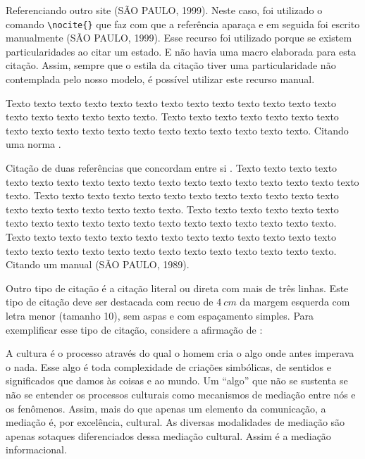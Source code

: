     Referenciando outro site \nocite{secretaria1999}(SÃO PAULO, 1999). Neste caso, foi utilizado o comando \verb=\nocite{}=
    que faz com que a referência aparaça e em seguida foi escrito manualmente (SÃO PAULO, 1999). Esse recurso foi utilizado porque se existem particularidades ao citar um estado. E não havia uma macro elaborada para esta citação. Assim, sempre que o estila da citação tiver uma particularidade não contemplada pelo nosso modelo, é possível utilizar este recurso manual.
    
    Texto texto texto texto texto texto texto texto texto texto texto texto texto texto texto texto texto texto texto. Texto texto texto texto texto texto texto texto texto texto texto texto texto texto texto texto texto texto texto. Citando uma norma \cite{NBR10520:2002}.
        
    Citação de duas referências que concordam entre si \cite{Almeida2018,Gondim2017}. Texto texto texto texto texto texto texto texto texto texto texto texto texto texto texto texto texto texto texto. Texto texto texto texto texto texto texto texto texto texto texto texto texto texto texto texto texto texto texto. Texto texto texto texto texto texto texto texto texto texto texto texto texto texto texto texto texto texto texto. Texto texto texto texto texto texto texto texto texto texto texto texto texto texto texto texto texto texto texto texto texto texto texto texto texto texto. Citando um manual \nocite{manuais1989}(SÃO PAULO, 1989). 
        
    Outro tipo de citação é a citação literal ou direta com mais de três linhas. Este tipo de citação deve ser destacada com recuo de $4~cm$ da margem esquerda com letra menor (tamanho 10), sem aspas e com espaçamento simples.  Para exemplificar esse tipo de citação, considere a afirmação de :
    \begin{citacao}
        A cultura é o processo através do qual o homem cria o algo onde antes imperava o nada. Esse algo é toda complexidade de criações simbólicas, de sentidos e significados que damos às coisas e ao mundo. Um ``algo'' que não se sustenta se não se entender os processos culturais como mecanismos de mediação entre nós e os fenômenos. Assim, mais do que apenas um elemento da comunicação, a mediação é, por excelência, cultural. As diversas modalidades de mediação são apenas sotaques diferenciados dessa mediação cultural. Assim é a mediação informacional.
    \end{citacao}
        
